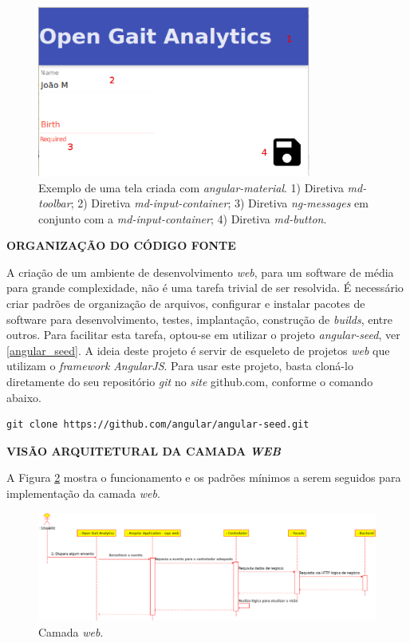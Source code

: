 \begin{figure}[ht]
	\centering
	\includegraphics[width=9cm]{figuras/material_amostra.eps}
	\caption[Exemplo de uma tela criada com \emph{angular-material}.]{Exemplo de uma tela criada com \emph{angular-material}. 1) Diretiva \emph{md-toolbar}; 2) Diretiva \emph{md-input-container}; 3) Diretiva \emph{ng-messages} em conjunto com a \emph{md-input-container}; 4) Diretiva \emph{md-button}.}
	\label{material_amostra}
\end{figure}

\textbf{ORGANIZAÇÃO DO CÓDIGO FONTE}

A criação de um ambiente de desenvolvimento \emph{web}, para um software de média para grande complexidade, não é uma tarefa trivial de ser resolvida.
É necessário criar padrões de organização de arquivos, configurar e instalar pacotes de software para desenvolvimento, testes, implantação, construção de \emph{builds}, entre outros.
Para facilitar esta tarefa, optou-se em utilizar o projeto \emph{angular-seed}, ver \ref{angular_seed}.
A ideia deste projeto é servir de esqueleto de projetos \emph{web} que utilizam o \emph{framework} \emph{AngularJS}.
Para usar este projeto, basta cloná-lo diretamente do seu repositório \emph{git} no \emph{site} github.com, conforme o comando abaixo.
\lstset{language=bash}
\begin{lstlisting}[frame=single]
git clone https://github.com/angular/angular-seed.git
\end{lstlisting}

\textbf{VISÃO ARQUITETURAL DA CAMADA \emph{WEB}}

A Figura \ref{camda_web} mostra o funcionamento e os padrões mínimos a serem seguidos para implementação da camada \emph{web}.

\begin{figure}[ht]
	\centering
	\includegraphics[width=17cm]{figuras/camada_web.eps}
	\caption{Camada \emph{web}.}
	\label{camda_web}
\end{figure}

